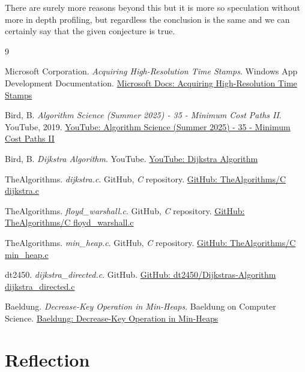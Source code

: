 \documentclass{article}
\begin{document}
There are surely more reasons beyond this but it is more so speculation without more in depth profiling, but regardless the conclusion is the same and we can certainly say that the given conjecture is true. 

\newpage
\begin{thebibliography}{9}

Microsoft Corporation.
\textit{Acquiring High-Resolution Time Stamps}.
Windows App Development Documentation.
\href{https://learn.microsoft.com/en-us/windows/win32/sysinfo/acquiring-high-resolution-time-stamps}{Microsoft Docs: Acquiring High-Resolution Time Stamps}

Bird, B.
\textit{Algorithm Science (Summer 2025) - 35 - Minimum Cost Paths II}.
YouTube, 2019.
\href{https://www.youtube.com/watch?v=ANZpc0zhc9Q}{YouTube: Algorithm Science (Summer 2025) - 35 - Minimum Cost Paths II}

Bird, B.
\textit{Dijkstra Algorithm}.
YouTube.
\href{https://www.youtube.com/watch?v=BejY7uiUhEs}{YouTube: Dijkstra Algorithm}

TheAlgorithms.
\textit{dijkstra.c}.
GitHub, \textit{C} repository.
\href{https://github.com/TheAlgorithms/C/blob/master/greedy_approach/dijkstra.c}{GitHub: TheAlgorithms/C dijkstra.c}

TheAlgorithms.
\textit{floyd\_warshall.c}.
GitHub, \textit{C} repository.
\href{https://github.com/TheAlgorithms/C/blob/master/data_structures/graphs/floyd_warshall.c}{GitHub: TheAlgorithms/C floyd\_warshall.c}

TheAlgorithms.
\textit{min\_heap.c}.
GitHub, \textit{C} repository.
\href{https://github.com/TheAlgorithms/C/blob/master/data_structures/heap/min_heap.c}{GitHub: TheAlgorithms/C min\_heap.c}

dt2450.
\textit{dijkstra\_directed.c}.
GitHub.
\href{https://github.com/dt2450/Dijkstras-Algorithm/blob/master/dijkstra_directed.c}{GitHub: dt2450/Dijkstras-Algorithm dijkstra\_directed.c}

Baeldung.
\textit{Decrease-Key Operation in Min-Heaps}.
Baeldung on Computer Science.
\href{https://www.baeldung.com/cs/min-heaps-decrease-key}{Baeldung: Decrease-Key Operation in Min-Heaps}

\end{thebibliography}

\newpage
\section*{Reflection}
\end{document}
